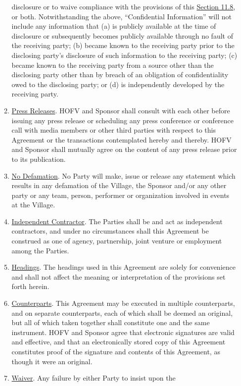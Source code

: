 \documentclass{article}
\begin{document}
\begin{enumerate}
\begin{enumerate}
    disclosure or to waive compliance with the provisions of this
    \uline{Section 11.8}, or both. Notwithstanding the above,
    ``Confidential Information'' will not include any information that
    (a) is publicly available at the time of disclosure or subsequently
    becomes publicly available through no fault of the receiving party;
    (b) became known to the receiving party prior to the disclosing
    party's disclosure of such information to the receiving party; (c)
    became known to the receiving party from a source other than the
    disclosing party other than by breach of an obligation of
    confidentiality owed to the disclosing party; or (d) is
    independently developed by the receiving party.
  \item
    \uline{Press Releases}. HOFV and Sponsor shall consult with each
    other before issuing any press release or scheduling any press
    conference or conference call with media members or other third
    parties with respect to this Agreement or the transactions
    contemplated hereby and thereby. HOFV and Sponsor shall mutually
    agree on the content of any press release prior to its publication.
  \item
    \uline{No Defamation}. No Party will make, issue or release any
    statement which results in any defamation of the Village, the
    Sponsor and/or any other party or any team, person, performer or
    organization involved in events at the Village.
  \item
    \uline{Independent Contractor}. The Parties shall be and act as
    independent contractors, and under no circumstances shall this
    Agreement be construed as one of agency, partnership, joint venture
    or employment among the Parties.
  \item
    \uline{Headings}. The headings used in this Agreement are solely for
    convenience and shall not affect the meaning or interpretation of
    the provisions set forth herein.
  \item
    \uline{Counterparts}. This Agreement may be executed in multiple
    counterparts, and on separate counterparts, each of which shall be
    deemed an original, but all of which taken together shall constitute
    one and the same instrument. HOFV and Sponsor agree that electronic
    signatures are valid and effective, and that an electronically
    stored copy of this Agreement constitutes proof of the signature and
    contents of this Agreement, as though it were an original.
  \item
    \uline{Waiver}. Any failure by either Party to insist upon the

\end{enumerate}
\end{enumerate}
\end{document}
